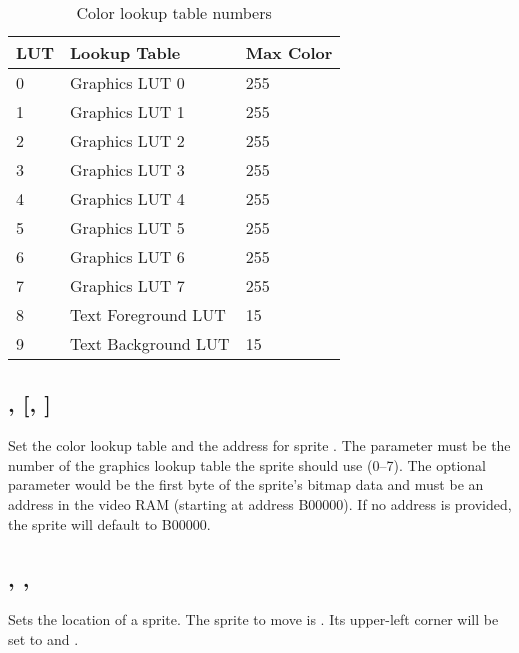 \documentclass{report}
\begin{document}
    \begin{table}[!htb]
        \begin{center}
            \begin{tabular}{|l|l|l|} \hline
                LUT & Lookup Table & Max Color \\ \hline\hline
                0 & Graphics LUT 0 & 255 \\ \hline
                1 & Graphics LUT 1 & 255 \\ \hline
                2 & Graphics LUT 2 & 255 \\ \hline
                3 & Graphics LUT 3 & 255 \\ \hline
                4 & Graphics LUT 4 & 255 \\ \hline
                5 & Graphics LUT 5 & 255 \\ \hline
                6 & Graphics LUT 6 & 255 \\ \hline
                7 & Graphics LUT 7 & 255 \\ \hline
                8 & Text Foreground LUT & 15 \\ \hline
                9 & Text Background LUT & 15 \\ \hline
            \end{tabular}
        \end{center}
        \caption{Color lookup table numbers}
        \label{luts}
    \end{table}

    \subsection*{ ,  [,  ]}

    Set the color lookup table and the address for sprite .
    The parameter  must be the number of the graphics lookup table the
    sprite should use (0--7).
    The optional parameter  would be the first byte of the sprite's
    bitmap data and must be an address in the video RAM (starting at address B00000).
    If no address is provided, the sprite will default to B00000.

    \subsection*{ , , }

    Sets the location of a sprite.
    The sprite to move is .
    Its upper-left corner will be set to  and .
\end{document}

